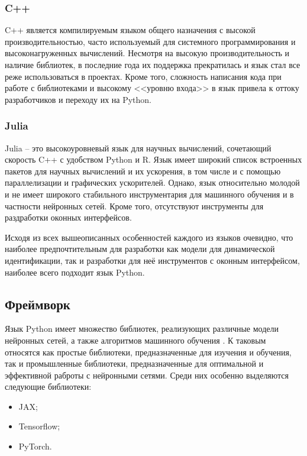 \subsubsection{C++} 
C++ является компилируемым языком общего назначения с высокой производительностью,
часто используемый для системного программирования и высоконагруженных
вычислений. Несмотря на высокую производительность и наличие библиотек, в
последние года их поддержка прекратилась и язык стал все реже использоваться в
проектах. Кроме того, сложность написания кода при работе с библиотеками и
высокому <<уровню входа>> в язык привела к оттоку разработчиков и переходу их
на Python.

\subsubsection{Julia} 
Julia – это высокоуровневый язык для научных вычислений, сочетающий скорость C++ с удобством Python и R. Язык имеет широкий список встроенных пакетов для научных вычислений и их ускорения, в том числе и с помощью параллелизации и графических ускорителей. Однако, язык относительно молодой и не имеет широкого стабильного инструментария для машинного обучения и в частности нейронных сетей. Кроме того, отсутствуют инструменты для раздработки оконных интерфейсов. 

Исходя из всех вышеописанных особенностей каждого из языков очевидно, что наиболее предпочтительным для разработки как модели для динамической идентификации, так и разработки для неё инструментов с оконным интерфейсом, наиболее всего подходит язык Python.

\subsection{Фреймворк}

Язык Python имеет множество библиотек, реализующих различные модели нейронных
сетей, а также алгоритмов машинного обучения \cite{bib:tools:simulation}. К 
таковым относятся как простые библиотеки, предназначенные для изучения и обучения, 
так и промышленные библиотеки, предназначенные для оптимальной и эффективной 
раброты с нейронными сетями. Среди них особенно выделяются следующие библиотеки:

\begin{itemize}
  \item JAX;
  \item Tensorflow;
  \item PyTorch. 
\end{itemize}

